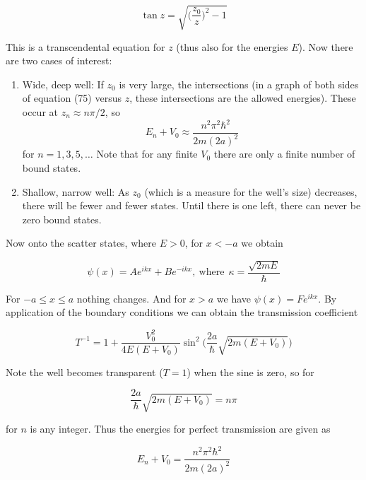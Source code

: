 \documentclass[a4paper]{article}
\begin{document}
\begin{equation}
	\tan z = \sqrt{\bigg(\frac{z_0}{z}\bigg)^2-1}
\end{equation}

This is a transcendental equation for $z$ (thus also for the energies $E$). Now there are two cases of interest:

\begin{enumerate}
	\item Wide, deep well: If $z_0$ is very large, the intersections (in a graph of both sides of equation (75) versus $z$, these intersections are the allowed energies). These occur at $z_n\approx n\pi/2$, so $$E_n+V_0\approx\frac{n^2\pi^2\hbar^2}{2m(2a)^2}$$ for $n=1,3,5,\dots$ Note that for any finite $V_0$ there are only a finite number of bound states.
	\item Shallow, narrow well: As $z_0$ (which is a measure for the well's size) decreases, there will be fewer and fewer states. Until there is one left, there can never be zero bound states.  
\end{enumerate}

Now onto the scatter states, where $E>0$, for $x<-a$ we obtain

\begin{equation}
	\psi(x)=Ae^{ikx}+Be^{-ikx}, \ \text{where}\ \ \kappa=\frac{\sqrt{2mE}}{\hbar}
\end{equation}

For $-a\le x\le a$ nothing changes. And for $x>a$ we have $\psi(x)=Fe^{ikx}$. By application of the boundary conditions we can obtain the transmission coefficient

\begin{equation}
	T^{-1} = 1+\frac{V_0^2}{4E(E+V_0)}\sin^2\bigg(\frac{2a}{\hbar}\sqrt{2m(E+V_0)}\bigg)
\end{equation}

Note the well becomes transparent ($T=1$) when the sine is zero, so for

\begin{equation}
	\frac{2a}{\hbar}\sqrt{2m(E+V_0)}=n\pi
\end{equation}

for $n$ is any integer. Thus the energies for perfect transmission are given as

\begin{equation}
	E_n+V_0=\frac{n^2\pi^2\hbar^2}{2m(2a)^2}
\end{equation}
\end{document}
